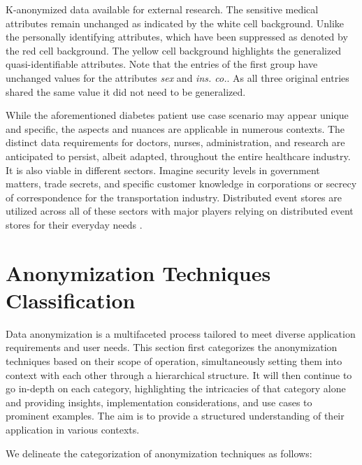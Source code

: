\begin{table}[ht]
\begin{center}
{\begin{adjustbox}{center}
            \end{adjustbox}
        }
    \caption{K-anonymized data available for external research. The sensitive medical attributes remain unchanged as indicated by the white cell background. Unlike the personally identifying attributes, which have been suppressed as denoted by the red cell background. The yellow cell background highlights the generalized quasi-identifiable attributes. Note that the entries of the first group have unchanged values for the attributes \textit{sex} and \textit{ins. co.}. As all three original entries shared the same value it did not need to be generalized.}
    \label{table:k_anon}
    \end{center}
\end{table}

While the aforementioned diabetes patient use case scenario may appear unique and specific, the aspects and nuances are applicable in numerous contexts. The distinct data requirements for doctors, nurses, administration, and research are anticipated to persist, albeit adapted, throughout the entire healthcare industry. 
It is also viable in different sectors. Imagine security levels in government matters, trade secrets, and specific customer knowledge in corporations or secrecy of correspondence for the transportation industry. Distributed event stores are utilized across all of these sectors with major players relying on distributed event stores for their everyday needs \cite{kafka}. 

\section{Anonymization Techniques Classification\label{sec:anonymization_hierarchy}}
Data anonymization is a multifaceted process tailored to meet diverse application requirements and user needs. This section first categorizes the anonymization techniques based on their scope of operation, simultaneously setting them into context with each other through a hierarchical structure. It will then continue to go in-depth on each category, highlighting the intricacies of that category alone and providing insights, implementation considerations, and use cases to prominent examples. The aim is to provide a structured understanding of their application in various contexts.\par

We delineate the categorization of anonymization techniques as follows: 

